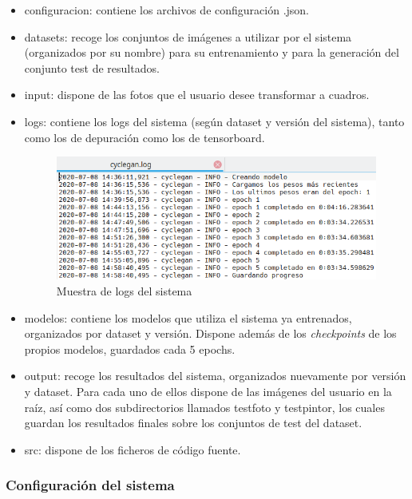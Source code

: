 \documentclass[../main.tex]{subfiles}
\begin{document}
\begin{itemize}
    \item configuracion: contiene los archivos de configuración .json.
    \item datasets: recoge los conjuntos de imágenes a utilizar por el sistema (organizados por su nombre) para su entrenamiento y para la generación del conjunto test de resultados.
    \item input: dispone de las fotos que el usuario desee transformar a cuadros.
    \item logs: contiene los logs del sistema (según dataset y versión del sistema), tanto como los de depuración como los de tensorboard.
        \begin{figure}[h!]
            \centering
            \includegraphics[width=1\textwidth]{imagenes/muestra_logs_cyclegan.png}
            \caption{Muestra de logs del sistema}
            \label{fig:muestra_logs_cyclegan}
        \end{figure}
    \item modelos: contiene los modelos que utiliza el sistema ya entrenados, organizados por dataset y versión. Dispone además de los \textit{checkpoints} de los propios modelos, guardados cada 5 epochs.
    \item output: recoge los resultados del sistema, organizados nuevamente por versión y dataset. Para cada uno de ellos dispone de las imágenes del usuario en la raíz, así como dos subdirectorios llamados test\textunderscore foto y test\textunderscore pintor, los cuales guardan los resultados finales sobre los conjuntos de test del dataset.
    \item src: dispone de los ficheros de código fuente.
\end{itemize}

\subsubsection{Configuración del sistema}
\end{document}
